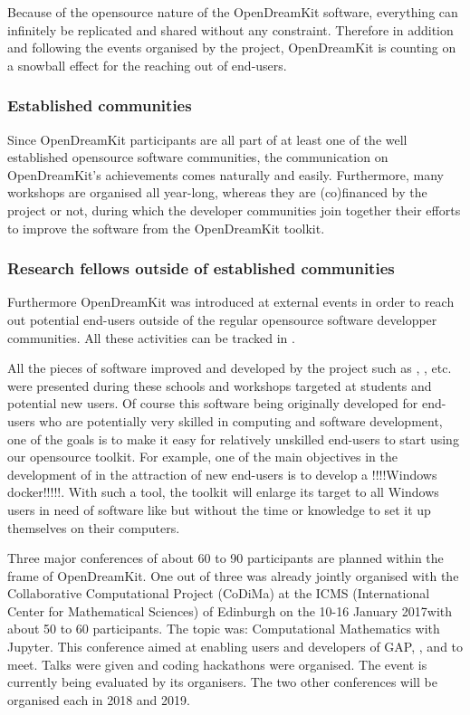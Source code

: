 \documentclass{deliverablereport}
\begin{document}
Because of the opensource nature of the OpenDreamKit software, everything can infinitely be replicated and shared without any constraint. Therefore in addition and following the events organised by the project, OpenDreamKit is counting on a snowball effect for the reaching out of end-users.



\subsubsection{Established communities}

Since OpenDreamKit participants are all part of at least one of the well established opensource software communities, the communication on OpenDreamKit's achievements comes naturally and easily. Furthermore, many workshops are organised all year-long, whereas they are (co)financed by the project or not, during which the developer communities join together their efforts to improve the software from the OpenDreamKit toolkit. 

\subsubsection{Research fellows outside of established communities}

Furthermore OpenDreamKit was introduced at external events in order to reach out potential end-users outside of the regular opensource software developper communities.
All these activities can be tracked in . 


All the pieces of software improved and developed by the project such as \Sage, \Singular, etc. were presented during these schools and workshops targeted at students and potential new users. Of course this software being originally developed for end-users who are potentially very skilled in computing and software development, one of the goals is to make it easy  for relatively unskilled end-users to start using our opensource toolkit. 
For example, one of the main objectives in the development of \Sage in the attraction of new end-users is to develop a !!!!Windows docker!!!!!. With such a tool, the toolkit will enlarge its target to all Windows users in need of software like \Sage but without the time or knowledge to set it up themselves on their computers.

Three major conferences of about 60 to 90 participants are planned within the frame of OpenDreamKit. One out of three was already jointly organised with the Collaborative Computational Project (CoDiMa) at the ICMS (International Center for Mathematical Sciences) of Edinburgh on the 10-16 January 2017with about 50 to 60 participants. The topic was: Computational Mathematics with Jupyter. This conference aimed at enabling users and developers of GAP, \Singular, \Sage and \Jupyter to meet. Talks were given and coding hackathons were organised. The event is currently being evaluated by its organisers. 
The two other conferences will be organised each in 2018 and 2019.

\end{document}
